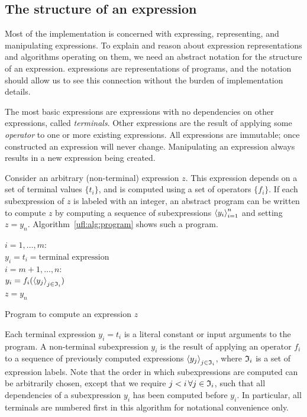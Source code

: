 \subsection{The structure of an expression} \label{ufl:sec:expressions}

Most of the \ufl{} implementation is concerned with
expressing, representing, and manipulating expressions.
To explain and reason about expression representations
and algorithms operating on them, we need an abstract
notation for the structure of an expression.
\ufl{} expressions are representations of programs,
and the notation should allow us to see this connection without the
burden of implementation details.

The most basic \ufl{} expressions are expressions with no dependencies
on other expressions, called \emph{terminals}.  Other expressions are
the result of applying some
\emph{operator} to one or more existing expressions.
All expressions are immutable; once constructed an
expression will never change. Manipulating an expression
always results in a new expression being created.

Consider an arbitrary (non-terminal) expression $z$.  This expression
depends on a set of terminal values $\{ t_i \}$, and is computed using
a set of operators $\{ f_i \}$.  If each subexpression of $z$ is
labeled with an integer, an abstract program can be written to compute
$z$ by computing a sequence of subexpressions $\left\langle{y_i}\right\rangle_{i=1}^n$ and
setting $z = y_n$.  Algorithm~\ref{ufl:alg:program} shows such a
program.

\begin{algorithm}
\afor $i = 1, \ldots, m$:\\
\tab $ y_i =  t_i = \mbox{terminal expression}$ \\
\afor $i = m+1, \ldots, n$:\\
\tab $ y_i =  f_i(\left\langle{y_j}\right\rangle_{j\in\mathfrak{I}_i})$ \\
$z = y_n$
\caption{Program to compute an expression $z$}
\label{ufl:alg:program}
\end{algorithm}

Each terminal expression $y_i = t_i$ is a literal constant or input
arguments to the program.  A non-terminal subexpression $y_i$ is the
result of applying an operator $f_i$ to a sequence of previously
computed expressions $\left\langle{y_j}\right\rangle_{j\in\mathfrak{I}_i}$, where $\mathfrak{I}_i$ is a set
of expression labels.  Note that the order in which subexpressions are
computed can be arbitrarily chosen, except that we require $j < i \,
\forall j \in \mathfrak{I}_i$, such that all dependencies of a subexpression
$y_i$ has been computed before $y_i$.  In particular, all terminals
are numbered first in this algorithm for notational convenience only.


